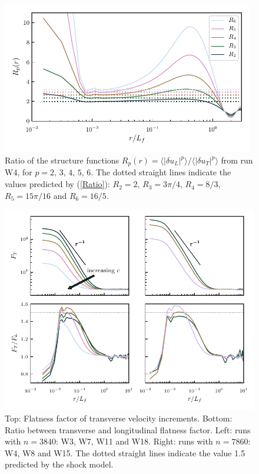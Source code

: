 \documentclass{jfm}
\newcommand{\mean}[1]{\langle #1 \rangle}
\begin{document}
\begin{figure}
\centerline{\includegraphics[width=11cm]{../Pyfig/fig_ratio_strfct}}
\caption{
Ratio of the structure functions
$R_p(r) = \mean{|\delta u_L|^p} / \mean{|\delta u_T|^p}$ from run W4,
for $ p = 2, \, 3, \, 4, \, 5, \, 6. $
The dotted straight lines indicate the values predicted by (\ref{Ratio}):
$R_2 = 2$, $R_3 = 3\pi/4$,  $R_4 = 8/3$, $ R_5 = 15 \pi /16 $ and $ R_6 = 16/5 $.}
\label{fig_ratio}
\end{figure}

\begin{figure}
\centerline{\includegraphics[width=12cm]{../Pyfig/fig_flatness}}
\caption{ Top: Flatness factor of transverse velocity increments. Bottom: Ratio between transverse and longitudinal flatness factor. Left: runs with $ n=3840 $: W3,
W7, W11 and W18. Right: runs with $ n = 7860 $: W4, W8 and W15.  The dotted straight lines indicate the value 1.5 predicted by the shock model.  }
\label{fig_flatness}
\end{figure}
\end{document}
